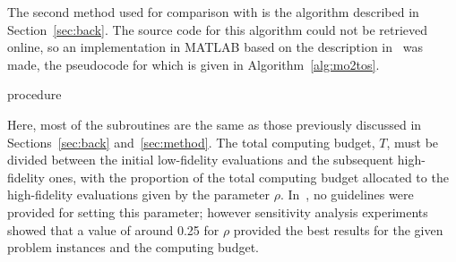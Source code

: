 The second method used for comparison with \AlgName{} is the \motos{} algorithm described in Section~\ref{sec:back}. The source code for this algorithm could not be retrieved online, so an implementation in MATLAB based on the description in~\cite{xu2016mo2tos} was made, the pseudocode for which is given in Algorithm~\ref{alg:mo2tos}.
\begin{algorithm}[h!] 
\caption{\motos{} procedure}
\label{alg:mo2tos}
{\footnotesize
\begin{algorithmic}[1]
 
 
 
 
 
 
   
   
   
   
   
\ENDWHILE
{} 
\end{algorithmic}
}
\end{algorithm}

Here, most of the subroutines are the same as those previously discussed in Sections~\ref{sec:back} and~\ref{sec:method}. The total computing budget, $T$, must be divided between the initial low-fidelity evaluations and the subsequent high-fidelity ones, with the proportion of the total computing budget allocated to the high-fidelity evaluations given by the parameter $\rho$. In~\cite{xu2016mo2tos}, no guidelines were provided for setting this parameter; however sensitivity analysis experiments showed that a value of around 0.25 for $\rho$ provided the best results for the given problem instances and the computing budget. 

